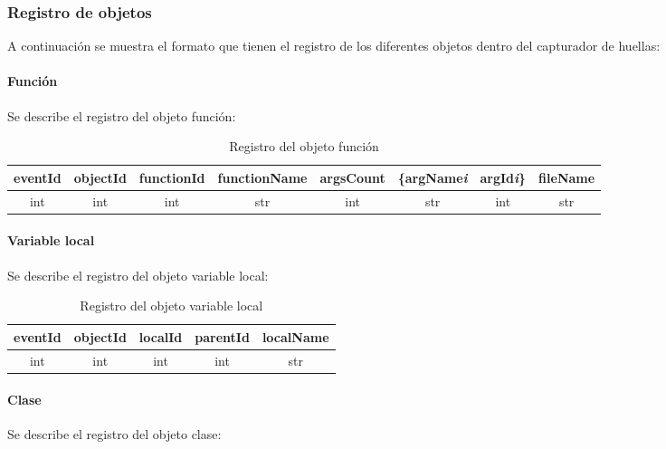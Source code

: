 \documentclass[12pt,legalpaper]{report}
\begin{document}
			\subsubsection{Registro de objetos}

A continuación se muestra el formato que tienen el registro de los diferentes objetos dentro del capturador de huellas:\\

				\paragraph{Función}
Se describe el registro del objeto función:\\

\begin{table}[!h]
\begin{small}
\begin{center}
\begin{tabular}{| c | c | c | c | c | c | c | c |}
\hline
\rowcolor[gray]{0.9}eventId & objectId & functionId & functionName & argsCount & \{argName\textit{{\scriptsize  i}} & argId\textit{{\scriptsize  i}}\} & fileName\\
\hline
int & int & int & str & int & str & int & str\\
\hline
\end{tabular}
\caption{Registro del objeto función} 
\end{center}
\end{small}
\end{table}

				\paragraph{Variable local}
Se describe el registro del objeto variable local:\\

\begin{table}[!h]
\begin{center}
\begin{tabular}{| c | c | c | c | c |}
\hline
\rowcolor[gray]{0.9}eventId & objectId & localId & parentId & localName\\
\hline
int & int & int & int & str\\
\hline
\end{tabular}
\caption{Registro del objeto variable local} 
\end{center}
\end{table}

				\paragraph{Clase}
Se describe el registro del objeto clase:\\
\end{document}
